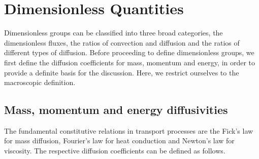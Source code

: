 \section{Dimensionless Quantities}
Dimensionless groups can be classified into three broad categories, the dimensionless fluxes, the ratios of convection and diffusion and the ratios of different types of diffusion. Before proceeding to define dimensionless groups, we first define the diffusion coefficients for mass, momentum and energy, in order to provide a definite basis for the discussion. Here, we restrict ourselves to the macroscopic definition.


\subsection{Mass, momentum and energy diffusivities}
The fundamental constitutive relations in transport processes are the Fick's law for mass diffusion, Fourier's law for heat conduction and Newton's law for viscosity. The respective diffusion coefficients can be defined as follows.
%
